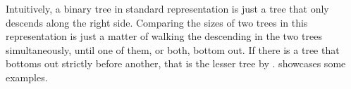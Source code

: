 Intuitively, a binary tree in standard representation is just a tree that only
descends along the right side. Comparing the sizes of two trees in this
representation is just a matter of walking the descending in the two trees
simultaneously, until one of them, or both, bottom out. If there is a tree that
bottoms out strictly before another, that is the lesser tree by
.  showcases
some examples.

\begin{figure}[htbp!]
\centering
{}
\end{figure}
